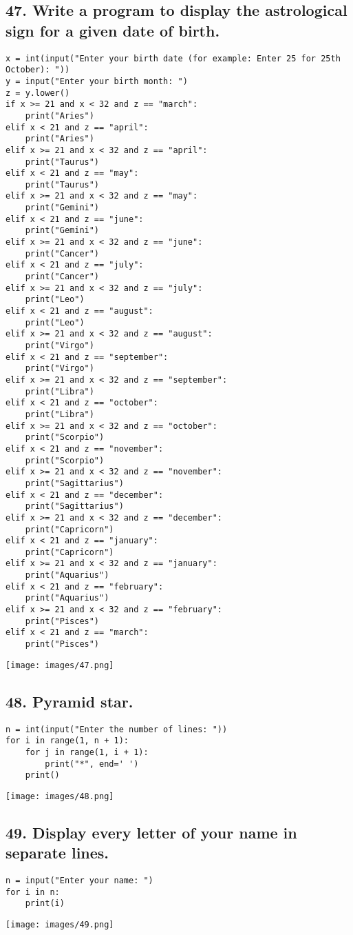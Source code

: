 \documentclass[12pt]{article}
\begin{document}
\subsection*{47. Write a program to display the astrological sign for a given date of birth.}
\begin{verbatim}
x = int(input("Enter your birth date (for example: Enter 25 for 25th October): "))
y = input("Enter your birth month: ")
z = y.lower()
if x >= 21 and x < 32 and z == "march":
    print("Aries")
elif x < 21 and z == "april":
    print("Aries")
elif x >= 21 and x < 32 and z == "april":
    print("Taurus")
elif x < 21 and z == "may":
    print("Taurus")
elif x >= 21 and x < 32 and z == "may":
    print("Gemini")
elif x < 21 and z == "june":
    print("Gemini")
elif x >= 21 and x < 32 and z == "june":
    print("Cancer")
elif x < 21 and z == "july":
    print("Cancer")
elif x >= 21 and x < 32 and z == "july":
    print("Leo")
elif x < 21 and z == "august":
    print("Leo")
elif x >= 21 and x < 32 and z == "august":
    print("Virgo")
elif x < 21 and z == "september":
    print("Virgo")
elif x >= 21 and x < 32 and z == "september":
    print("Libra")
elif x < 21 and z == "october":
    print("Libra")
elif x >= 21 and x < 32 and z == "october":
    print("Scorpio")
elif x < 21 and z == "november":
    print("Scorpio")
elif x >= 21 and x < 32 and z == "november":
    print("Sagittarius")
elif x < 21 and z == "december":
    print("Sagittarius")
elif x >= 21 and x < 32 and z == "december":
    print("Capricorn")
elif x < 21 and z == "january":
    print("Capricorn")
elif x >= 21 and x < 32 and z == "january":
    print("Aquarius")
elif x < 21 and z == "february":
    print("Aquarius")
elif x >= 21 and x < 32 and z == "february":
    print("Pisces")
elif x < 21 and z == "march":
    print("Pisces")
\end{verbatim}
\texttt{[image: images/47.png]}

\subsection*{48. Pyramid star.}
\begin{verbatim}
n = int(input("Enter the number of lines: "))
for i in range(1, n + 1):
    for j in range(1, i + 1):
        print("*", end=' ')
    print()
\end{verbatim}
\texttt{[image: images/48.png]}

\subsection*{49. Display every letter of your name in separate lines.}
\begin{verbatim}
n = input("Enter your name: ")
for i in n:
    print(i)
\end{verbatim}
\texttt{[image: images/49.png]}
\end{document}
